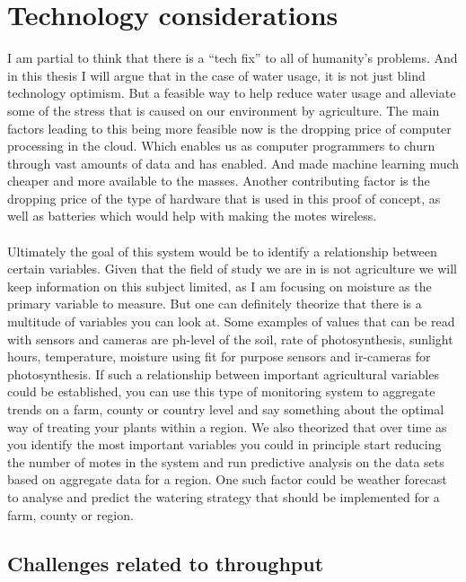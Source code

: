 \documentclass[]{uiophd}
\begin{document}
\chapter{Technology considerations}
I am partial to think that there is a “tech fix” to all of humanity's problems. And in this thesis I will argue that in the case of water usage, it is not just blind technology optimism. But a feasible way to help reduce water usage and alleviate some of the stress that is caused on our environment by agriculture. The main factors leading to this being more feasible now is the dropping price of computer processing in the cloud. Which enables us as computer programmers to churn through vast amounts of data and has enabled. And made machine learning much cheaper and more available to the masses. Another contributing factor is the dropping price of the type of hardware that is used in this proof of concept, as well as batteries which would help with making the motes wireless.
\\\\
Ultimately the goal of this system would be to identify a relationship between certain variables.  Given that the field of study we are in is not agriculture we will keep information on this subject limited, as I am focusing on moisture as the primary variable to measure. But one can definitely theorize that there is a multitude of variables you can look at. Some examples of values that can be read with sensors and cameras are ph-level of the soil, rate of photosynthesis, sunlight hours, temperature, moisture using fit for purpose sensors and ir-cameras for photosynthesis. If such a relationship between important agricultural variables could be established, you can use this type of monitoring system to aggregate trends on a farm, county or country level and say something about the optimal way of treating your plants within a region. We also theorized that over time as you identify the most important variables you could in principle start reducing the number of motes in the system and run predictive analysis on the data sets based on aggregate data for a region. One such factor could be weather forecast to analyse and predict the watering strategy that should be implemented for a farm, county or region. 


\section{Challenges related to throughput}
\end{document}
